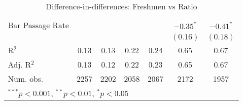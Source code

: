 \begin{table}
\begin{center}
\begin{tabular}{l c c c c c c }
Bar Passage Rate      &                &                &                 &                & $-0.35^{*}$    & $-0.41^{*}$    \\
                      &                &                &                 &                & $(0.16)$       & $(0.18)$       \\
\hline
R$^2$                 & 0.13           & 0.13           & 0.22            & 0.24           & 0.65           & 0.67           \\
Adj. R$^2$            & 0.13           & 0.12           & 0.22            & 0.23           & 0.65           & 0.67           \\
Num. obs.             & 2257           & 2202           & 2058            & 2067           & 2172           & 1957           \\
\hline
\multicolumn{7}{l}{\scriptsize{$^{***}p<0.001$, $^{**}p<0.01$, $^*p<0.05$}}
\end{tabular}
\caption{Difference-in-differences: Freshmen vs Ratio}
\label{tab:class-ratio}
\end{center}
\end{table}
\clearpage
